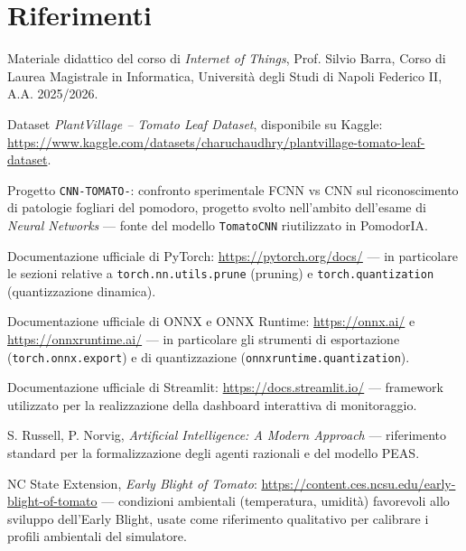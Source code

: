 \section{Riferimenti}
\label{sec:riferimenti}

\begin{enumerate}[leftmargin=1.4cm, label={[\arabic*]}]
    \item \label{bib:corso} Materiale didattico del corso di \emph{Internet of Things},
    Prof. Silvio Barra, Corso di Laurea Magistrale in Informatica,
    Università degli Studi di Napoli Federico II, A.A. 2025/2026.

    \item \label{bib:dataset} Dataset \emph{PlantVillage -- Tomato Leaf Dataset}, disponibile su
    Kaggle: \url{https://www.kaggle.com/datasets/charuchaudhry/plantvillage-tomato-leaf-dataset}.

    \item \label{bib:cnntomato} Progetto \texttt{CNN-TOMATO-}: confronto sperimentale FCNN vs CNN
    sul riconoscimento di patologie fogliari del pomodoro, progetto svolto
    nell'ambito dell'esame di \emph{Neural Networks} --- fonte del modello
    \texttt{TomatoCNN} riutilizzato in PomodorIA.

    \item \label{bib:pytorch} Documentazione ufficiale di PyTorch: \url{https://pytorch.org/docs/}
    --- in particolare le sezioni relative a \texttt{torch.nn.utils.prune}
    (pruning) e \texttt{torch.quantization} (quantizzazione dinamica).

    \item \label{bib:onnx} Documentazione ufficiale di ONNX e ONNX Runtime:
    \url{https://onnx.ai/} e \url{https://onnxruntime.ai/} --- in
    particolare gli strumenti di esportazione (\texttt{torch.onnx.export})
    e di quantizzazione (\texttt{onnxruntime.quantization}).

    \item \label{bib:streamlit} Documentazione ufficiale di Streamlit: \url{https://docs.streamlit.io/}
    --- framework utilizzato per la realizzazione della dashboard
    interattiva di monitoraggio.

    \item \label{bib:rn} S. Russell, P. Norvig, \emph{Artificial Intelligence: A Modern
    Approach} --- riferimento standard per la formalizzazione degli agenti
    razionali e del modello PEAS.

    \item \label{bib:earlyblight} NC State Extension, \emph{Early Blight of Tomato}:
    \url{https://content.ces.ncsu.edu/early-blight-of-tomato} --- condizioni
    ambientali (temperatura, umidità) favorevoli allo sviluppo dell'Early
    Blight, usate come riferimento qualitativo per calibrare i profili
    ambientali del simulatore.


\end{enumerate}
